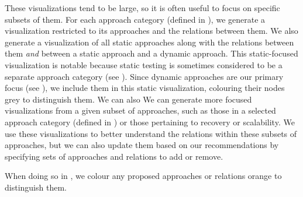 \fi
These visualizations tend to be large, so it is often useful to focus on
specific subsets of them. \ifnotpaper For each approach category (defined in
    ), we generate a visualization restricted to its approaches
    and the relations between them. We also generate a visualization of all static
    approaches along with the relations between them \emph{and} between a
    static approach and a dynamic approach. This static-focused visualization is
    notable because static testing is sometimes considered to be a separate
    approach category (see ). Since dynamic
    approaches are our primary focus (see ), we include them
    in this static visualization, colouring their nodes grey to distinguish them.
    We can also \else We can \fi generate more focused visualizations from a
given subset of approaches, such as \ifnotpaper\else those in a selected
    approach category (defined in ) or \fi those pertaining to
recovery or scalability.
We use these visualizations to better understand the relations within these
subsets of approaches, but we can also update them based on
our recommendations by specifying sets of approaches and relations to add or
remove. %
\ifnotpaper
    
\else
    When doing so in , we colour any proposed approaches
    or relations orange to distinguish them.
\fi
